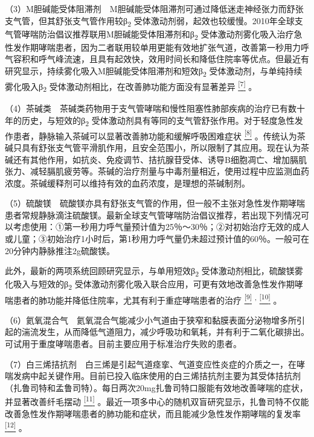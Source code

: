 （3）M胆碱能受体阻滞剂　M胆碱能受体阻滞剂可通过降低迷走神经张力而舒张支气管，但其舒张支气管作用较β\textsubscript{2}
受体激动剂弱，起效也较缓慢。2010年全球支气管哮喘防治倡议推荐联用M胆碱能受体阻滞剂和β\textsubscript{2}
受体激动剂雾化吸入治疗急性发作期哮喘患者，因为二者联用较单用更能有效地扩张气道，改善第一秒用力呼气容积和呼气峰流速，且具有起效快，效用时间长和降低住院率等优点。但最近有研究显示，持续雾化吸入M胆碱能受体阻滞剂和短效β\textsubscript{2}
受体激动剂，与单纯持续雾化吸入β\textsubscript{2}
受体激动剂相比，在改善肺功能方面没有显著差异
\protect\hyperlink{text00013.htmlux5cux23ch7-12}{\textsuperscript{{[}7{]}}}
。

（4）茶碱类　茶碱类药物用于支气管哮喘和慢性阻塞性肺部疾病的治疗已有数十年的历史，与短效的β\textsubscript{2}
受体激动剂具有等同的支气管舒张作用。对于轻度急性发作患者，静脉输入茶碱可以显著改善肺功能和缓解呼吸困难症状
\protect\hyperlink{text00013.htmlux5cux23ch8-12}{\textsuperscript{{[}8{]}}}
。传统认为茶碱只具有舒张支气管平滑肌作用，且安全范围小，所以限制了其应用。现在认为茶碱还有其他作用，如抗炎、免疫调节、拮抗腺苷受体、诱导B细胞凋亡、增加膈肌张力、减轻膈肌疲劳等。茶碱的治疗剂量与中毒剂量相近，使用过程中应监测血药浓度。茶碱缓释剂可以维持有效的血药浓度，是理想的茶碱制剂。

（5）硫酸镁　硫酸镁亦具有舒张支气管的作用，但一般不主张对急性发作期哮喘患者常规静脉滴注硫酸镁。最新全球支气管哮喘防治倡议推荐，若出现下列情况可以考虑使用：①第一秒用力呼气量预计值为25％～30％；②对初始治疗无效的成人或儿童；③初始治疗1小时后，第1秒用力呼气量仍未超过预计值的60％。一般可在20分钟内静脉推注2g硫酸镁。

此外，最新的两项系统回顾研究显示，与单用短效β\textsubscript{2}
受体激动剂相比，硫酸镁雾化吸入与短效的β\textsubscript{2}
受体激动剂雾化吸入联合应用，可更有效地改善急性发作期哮喘患者的肺功能并降低住院率，尤其有利于重症哮喘患者的治疗
\protect\hyperlink{text00013.htmlux5cux23ch9-12}{\textsuperscript{{[}9{]}}}
\textsuperscript{,}
\protect\hyperlink{text00013.htmlux5cux23ch10-12}{\textsuperscript{{[}10{]}}}
。

（6）氦氧混合气　氦氧混合气能减少小气道由于狭窄和黏膜表面分泌物增多所引起的湍流发生，从而降低气道阻力，减少呼吸功和氧耗，并有利于二氧化碳排出。可试用于重度哮喘患者。目前主要应用于标准治疗失败的患者。

（7）白三烯拮抗剂　白三烯是引起气道痉挛、气道变应性炎症的介质之一，在哮喘发病中起关键作用。目前已投入临床使用的白三烯拮抗剂主要为其受体拮抗剂（扎鲁司特和孟鲁司特）。每日两次20mg扎鲁司特口服能有效地改善哮喘的症状，并显著改善纤毛摆动
\protect\hyperlink{text00013.htmlux5cux23ch11-12}{\textsuperscript{{[}11{]}}}
。最近一项多中心的随机双盲研究显示，扎鲁司特不仅能改善急性发作期哮喘患者的肺功能和症状，而且能减少急性发作期哮喘的复发率
\protect\hyperlink{text00013.htmlux5cux23ch12-12}{\textsuperscript{{[}12{]}}}
。

